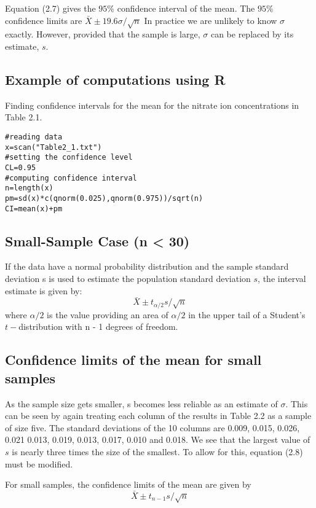 Equation (2.7) gives the $95\%$  confidence interval of the mean. The $95\%$  confidence
limits are $\bar{X} \pm 19.6 \sigma/\sqrt{n}$
In practice we are unlikely to know $\sigma$ exactly. However, provided that the sample is
large, $\sigma$ can be replaced by its estimate, $s$.


\subsection{Example of computations using R}
Finding confidence intervals for the mean for the nitrate ion
concentrations in Table 2.1.
\begin{verbatim}
#reading data
x=scan("Table2_1.txt")
#setting the confidence level
CL=0.95
#computing confidence interval
n=length(x)
pm=sd(x)*c(qnorm(0.025),qnorm(0.975))/sqrt(n)
CI=mean(x)+pm
\end{verbatim}

\subsection{Small-Sample Case (n < 30)}
If the data have a normal probability distribution and the sample
standard deviation s is used to estimate the population
standard deviation $s$, the interval estimate is given by:
\[ \bar{X} \pm t_{\alpha/2}s /\sqrt{n} \]
where $\alpha/2$ is the value providing an area of $\alpha/2$  in the upper tail
of a Student's $t-$distribution with n - 1 degrees of freedom.


\subsection{Confidence limits of the mean for small samples}

As the sample size gets smaller, s becomes less reliable as an estimate of $\sigma$. This can
be seen by again treating each column of the results in Table 2.2 as a sample of size
five. The standard deviations of the 10 columns are 0.009, 0.015, 0.026, 0.021
0.013, 0.019, 0.013, 0.017, 0.010 and 0.018. We see that the largest value of $s$ is
nearly three times the size of the smallest. To allow for this, equation (2.8) must be
modified.

For small samples, the confidence limits of the mean are given by
\[ \bar{X} \pm t_{n-1}s /\sqrt{n} \]


